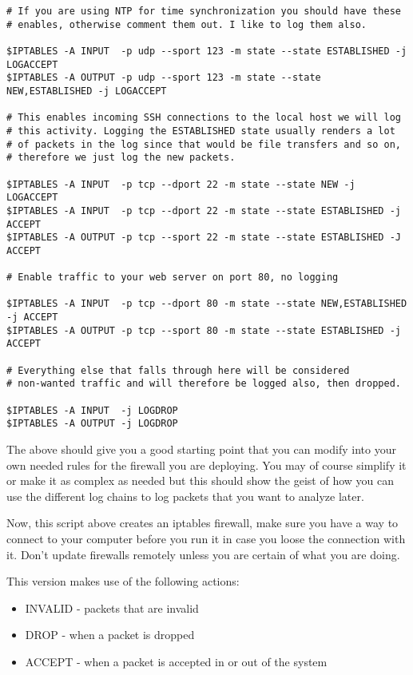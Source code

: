 \documentclass[english,twoside,openright,a4paper,12pt]{article}
\begin{document}
\begin{verbatim}
# If you are using NTP for time synchronization you should have these
# enables, otherwise comment them out. I like to log them also.

$IPTABLES -A INPUT  -p udp --sport 123 -m state --state ESTABLISHED -j LOGACCEPT 
$IPTABLES -A OUTPUT -p udp --sport 123 -m state --state NEW,ESTABLISHED -j LOGACCEPT

# This enables incoming SSH connections to the local host we will log
# this activity. Logging the ESTABLISHED state usually renders a lot
# of packets in the log since that would be file transfers and so on,
# therefore we just log the new packets.

$IPTABLES -A INPUT  -p tcp --dport 22 -m state --state NEW -j LOGACCEPT
$IPTABLES -A INPUT  -p tcp --dport 22 -m state --state ESTABLISHED -j ACCEPT 
$IPTABLES -A OUTPUT -p tcp --sport 22 -m state --state ESTABLISHED -J ACCEPT

# Enable traffic to your web server on port 80, no logging

$IPTABLES -A INPUT  -p tcp --dport 80 -m state --state NEW,ESTABLISHED -j ACCEPT 
$IPTABLES -A OUTPUT -p tcp --sport 80 -m state --state ESTABLISHED -j ACCEPT

# Everything else that falls through here will be considered
# non-wanted traffic and will therefore be logged also, then dropped.

$IPTABLES -A INPUT  -j LOGDROP
$IPTABLES -A OUTPUT -j LOGDROP
\end{verbatim} \normalsize

The above should give you a good starting point that you can modify
into your own needed rules for the firewall you are deploying. You may
of course simplify it or make it as complex as needed but this should
show the geist of how you can use the different log chains to log
packets that you want to analyze later.

Now, this script above creates an iptables firewall, make sure you
have a way to connect to your computer before you run it in case you
loose the connection with it. Don't update firewalls remotely unless
you are certain of what you are doing.

This version makes use of the following actions:

\begin{itemize}
	\item INVALID - packets that are invalid
	\item DROP - when a packet is dropped
	\item ACCEPT - when a packet is accepted in or out of the system
\end{itemize}
\end{document}
